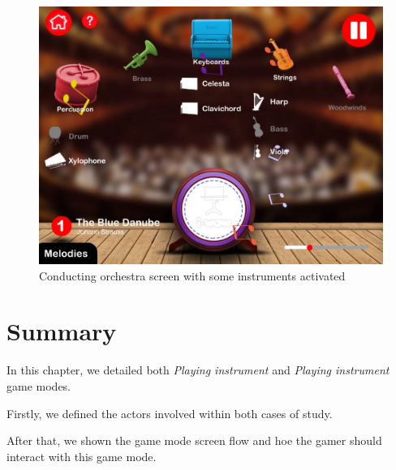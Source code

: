 \begin{figure}[ht!]
	\centering
	\includegraphics[width=400pt]{graphics/use-case/conducting_some_screen.jpg}
	\caption{Conducting orchestra screen with some instruments activated}
	\label{fig:conducting_some_screen}
\end{figure}

\section{Summary}
In this chapter, we detailed both \textit{Playing instrument} and \textit{Playing instrument} game modes.

Firstly, we defined the actors involved within both cases of study.

After that, we shown the game mode screen flow and hoe the gamer should interact with this game mode.
